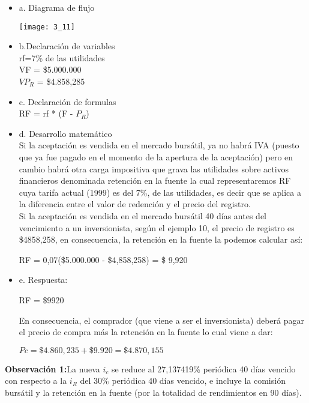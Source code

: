 	\begin{itemize}
		\item a. Diagrama de flujo\\
		\begin{center}
			\texttt{[image: 3\_11]}
		\end{center}	
		\item b.Declaración de variables\\
		rf=7\% de las utilidades\\
		VF = \$5.000.000\\
		$VP_{R}$ = \$4.858,285\\
		\item c. Declaración de formulas\\
		RF = rf * (F - $P_{R}$) \\
		\item d. Desarrollo matemático\\
		
		Si la aceptación es vendida en el mercado bursátil, ya no habrá IVA (puesto que ya fue pagado en el momento de la apertura de la aceptación) pero en cambio habrá otra carga impositiva que grava las utilidades sobre activos financieros denominada retención en la fuente la cual representaremos RF cuya tarifa actual (1999) es del 7\%, de las utilidades, es decir que se aplica a la diferencia entre el valor de redención y el precio del registro.\\
		Si la aceptación es vendida en el mercado bursátil 40 días antes del vencimiento a un inversionista, según el ejemplo 10, el precio de registro es \$4858,258, en consecuencia, la retención en la fuente la podemos calcular así: \\
		\begin{center}
			RF = 0,07(\$5.000.000 - \$4,858,258) = \$ 9,920\\
		\end{center}
		
		\item e. Respuesta:\\
		\begin{center}
			RF = \$9920
		\end{center}
		En consecuencia, el comprador (que viene a ser el inversionista) deberá pagar el precio de compra más la retención en la fuente lo cual viene a dar: \\
		\begin{center}
		    $Pc = \$4.860,235 + \$9.920 = \$4.870,155$
		\end{center}
		
	\end{itemize}
	\textbf{Observación 1:}La nueva $i_{c}$ se reduce al 27,137419\% periódica 40 días vencido con respecto a la $i_{R}$ del 30\% periódica 40 días vencido, e incluye la comisión bursátil y la retención en la fuente (por la totalidad de rendimientos en 90 días).\\
	
